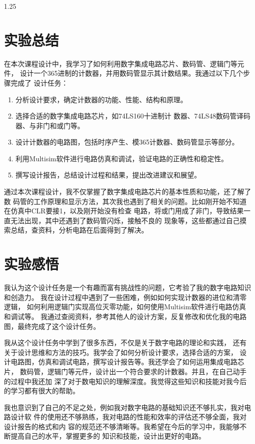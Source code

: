\documentclass[12p,UTF8]{article}
\begin{document}
\begin{spacing}{1.25}
  \section{实验总结}
  在本次课程设计中，我学习了如何利用数字集成电路芯片、数码管、逻辑门等元件，
  设计一个365进制的计数器，并用数码管显示其计数结果。我通过以下几个步骤完成了
  设计任务：



  \begin{enumerate}
    \item 分析设计要求，确定计数器的功能、性能、结构和原理。
    \item 选择合适的数字集成电路芯片，如74LS160十进制计
          数器、74LS48数码管译码器、与非门和或门等。
    \item 设计计数器的电路图，包括时序产生、模365计数器、数码管显示等部分。
    \item 利用Multisim软件进行电路仿真和调试，验证电路的正确性和稳定性。
    \item 撰写设计报告，总结设计过程和结果，提出改进建议和展望。
  \end{enumerate}

  通过本次课程设计，我不仅掌握了数字集成电路芯片的基本性质和功能，还了解了数
  码管的工作原理和显示方法，其次我也遇到了相关的问题。比如刚开始不知道在仿真中CLR要接1，以及刚开始没有检查
  电路，将或门用成了非门，导致结果一直无法出现，其中还遇到了数码管闪烁，接触不良的
  现象等，这些都通过自己摸索总结，查资料，分析电路在后面得到了解决。

  \section{实验感悟}
  我认为这个设计任务是一个有趣而富有挑战性的问题，它考验了我的数字电路知识和创造力。
  我在设计过程中遇到了一些困难，例如如何实现计数器的进位和清零逻辑，
  如何利用逻辑门实现高位灭零功能，如何使用Multisim软件进行电路仿真和调试等。
  我通过查阅资料，参考其他人的设计方案，反复修改和优化我的电路图，最终完成了这个设计任务。

  我从这个设计任务中学到了很多东西，不仅是关于数字电路的理论和实践，
  还有关于设计思维和方法的技巧。我学会了如何分析设计要求，选择合适的方案，
  设计电路图，仿真和调试电路，撰写设计报告等。我还学会了如何运用集成电路芯片，
  数码管，逻辑门等元件，设计出一个符合要求的计数器。并且，在自己动手的过程中我还加
  深了对于数电知识的理解深度。我觉得这些知识和技能对我今后的学习都有很大的帮助。

  我也意识到了自己的不足之处，例如我对数字电路的基础知识还不够扎实，我对电路设计软
  件的使用还不够熟练，我对电路的性能和效率的评估还不够全面，我对设计报告的格式和内
  容的规范还不够清晰等。我希望在今后的学习中，我能够不断提高自己的水平，掌握更多的
  知识和技能，设计出更好的电路。



\end{spacing}
\end{document}
